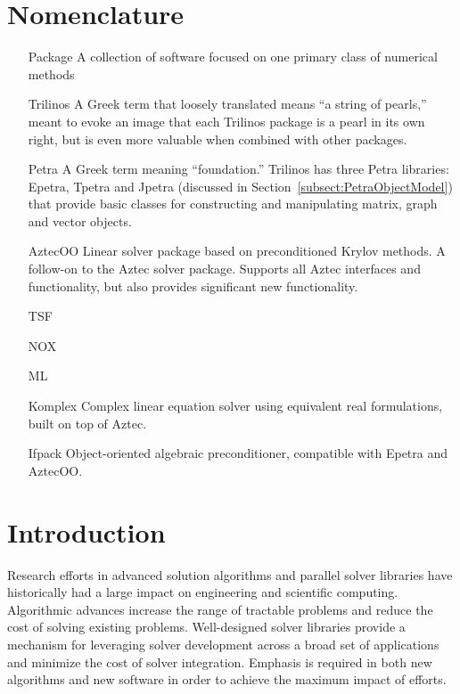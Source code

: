 \documentclass[12pt,relax]{SANDreport}
\begin{document}
    \section*{Nomenclature}
    \begin{itemize}
	\item[Package]
	    A collection of software focused on one primary class of numerical methods
	\item[Trilinos]
	    A Greek term that loosely translated means ``a string of pearls,'' meant
         to evoke an image that each Trilinos package is a pearl in its own right,
         but is even more valuable when combined with other packages.
	\item[Petra]
	    A Greek term meaning ``foundation.''  Trilinos has three Petra libraries: Epetra, 
	    Tpetra and Jpetra (discussed in Section~\ref{subsect:PetraObjectModel}) that
	    provide basic classes for constructing and manipulating matrix, graph and vector 
	    objects.
        \item[AztecOO] Linear solver package based on preconditioned Krylov methods.  A
	  follow-on to the Aztec solver package.  Supports all Aztec interfaces and
	  functionality, but also provides significant new functionality.
	\item[TSF]
	\item[NOX]
	\item[ML]
	\item[Komplex] Complex linear equation solver using equivalent real formulations,
	  built on top of Aztec.
	\item[Ifpack] Object-oriented algebraic preconditioner, compatible with Epetra and
	  AztecOO.
    \end{itemize}


    \SANDmain		%

\section{Introduction}

Research efforts in advanced solution algorithms and parallel solver
libraries have historically had a large impact on engineering and
scientific computing.  Algorithmic advances increase the range
of tractable problems and reduce the cost of solving existing
problems.  Well-designed solver libraries provide a mechanism for
leveraging solver development across a broad set of applications and
minimize the cost of solver integration.  Emphasis is
required in both new algorithms and new software in order
to achieve the maximum impact of efforts.
\end{document}
